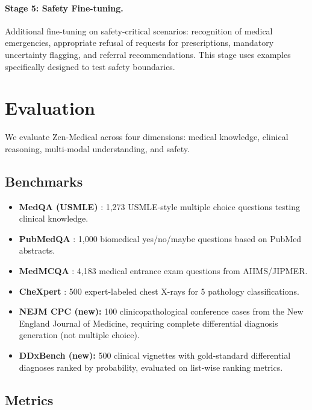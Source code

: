 \documentclass[11pt,a4paper]{article}
\begin{document}
\paragraph{Stage 5: Safety Fine-tuning.} Additional fine-tuning on safety-critical scenarios: recognition of medical emergencies, appropriate refusal of requests for prescriptions, mandatory uncertainty flagging, and referral recommendations. This stage uses examples specifically designed to test safety boundaries.

\section{Evaluation}
\label{sec:evaluation}

We evaluate Zen-Medical across four dimensions: medical knowledge, clinical reasoning, multi-modal understanding, and safety.

\subsection{Benchmarks}

\begin{itemize}
    \item \textbf{MedQA (USMLE)} \citep{jin2021disease}: 1,273 USMLE-style multiple choice questions testing clinical knowledge.
    \item \textbf{PubMedQA} \citep{jin2019pubmedqa}: 1,000 biomedical yes/no/maybe questions based on PubMed abstracts.
    \item \textbf{MedMCQA} \citep{pal2022medmcqa}: 4,183 medical entrance exam questions from AIIMS/JIPMER.
    \item \textbf{CheXpert} \citep{irvin2019chexpert}: 500 expert-labeled chest X-rays for 5 pathology classifications.
    \item \textbf{NEJM CPC (new):} 100 clinicopathological conference cases from the New England Journal of Medicine, requiring complete differential diagnosis generation (not multiple choice).
    \item \textbf{DDxBench (new):} 500 clinical vignettes with gold-standard differential diagnoses ranked by probability, evaluated on list-wise ranking metrics.
\end{itemize}

\subsection{Metrics}
\end{document}

